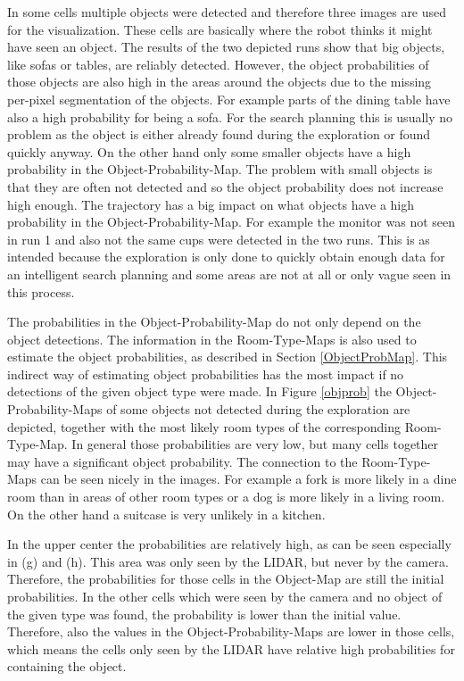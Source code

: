 In some cells multiple objects were detected and therefore three images are used for the visualization. These cells are basically where the robot thinks it might have seen an object. The results of the two depicted runs show that big objects, like sofas or tables, are reliably detected. However, the object probabilities of those objects are also high in the areas around the objects due to the missing per-pixel segmentation of the objects. For example parts of the dining table have also a high probability for being a sofa. For the search planning this is usually no problem as the object is either already found during the exploration or found quickly anyway. On the other hand only some smaller objects have a high probability in the Object-Probability-Map. The problem with small objects is that they are often not detected and so the object probability does not increase high enough. The trajectory has a big impact on what objects have a high probability in the Object-Probability-Map. For example the monitor was not seen in run 1 and also not the same cups were detected in the two runs. This is as intended because the exploration is only done to quickly obtain enough data for an intelligent search planning and some areas are not at all or only vague seen in this process.

The probabilities in the Object-Probability-Map do not only depend on the object detections. The information in the Room-Type-Maps is also used to estimate the object probabilities, as described in Section \ref{ObjectProbMap}. This indirect way of estimating object probabilities has the most impact if no detections of the given object type were made. In Figure \ref{objprob} the Object-Probability-Maps of some objects not detected during the exploration are depicted, together with the most likely room types of the corresponding Room-Type-Map. In general those probabilities are very low, but many cells together may have a significant object probability. The connection to the Room-Type-Maps can be seen nicely in the images. For example a fork is more likely in a dine room than in areas of other room types or a dog is more likely in a living room. On the other hand a suitcase is very unlikely in a kitchen. 

In the upper center the probabilities are relatively high, as can be seen especially in (g) and (h). This area was only seen by the LIDAR, but never by the camera. Therefore, the probabilities for those cells in the Object-Map are still the initial probabilities. In the other cells which were seen by the camera and no object of the given type was found, the probability is lower than the initial value. Therefore, also the values in the Object-Probability-Maps are lower in those cells, which means the cells only seen by the LIDAR have relative high probabilities for containing the object. 

